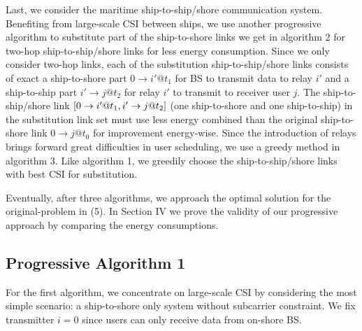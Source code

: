 \documentclass[conference]{IEEEtran}
\begin{document}
Last, we consider the maritime ship-to-ship/shore communication system. Benefiting from large-scale CSI between ships, we use another progressive algorithm to substitute part of the ship-to-shore links we get in algorithm 2 for two-hop ship-to-ship/shore links for less energy consumption. Since we only consider two-hop links, each of the substitution ship-to-ship/shore links consists of exact a ship-to-shore part $0 \to i'@{t_1}$ for BS to transmit data to relay ${i'}$ and a ship-to-ship part $i' \to j@{t_2}$ for relay ${i'}$ to transmit to receiver user $j$. The ship-to-ship/shore link $\left[ {{\rm{0}} \to i'@{t_1},i' \to j@{t_2}} \right]$ (one ship-to-shore and one ship-to-ship) in the substitution link set must use less energy combined than the original ship-to-shore link $0 \to j@{t_0}$ for improvement energy-wise. Since the introduction of relays brings forward great difficulties in user scheduling, we use a greedy method in algorithm 3. Like algorithm 1, we greedily choose the ship-to-ship/shore links with best CSI for substitution. 

Eventually, after three algorithms, we approach the optimal solution for the original-problem in (5). In Section IV we prove the validity of our progressive approach by comparing the energy consumptions. 

\subsection{Progressive Algorithm 1}

For the first algorithm, we concentrate on large-scale CSI by considering the most simple scenario: a ship-to-shore only system without subcarrier constraint. We fix transmitter $i = 0$ since users can only receive data from on-shore BS. 
\end{document}
